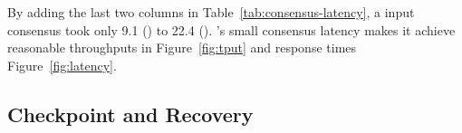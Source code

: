 By adding the last two columns in Table~\ref{tab:consensus-latency}, a 
\xxx input consensus took only 9.1 \us (\redis) to 22.4 \us (\mediatomb). 
\xxx's small consensus latency makes it achieve reasonable throughputs 
in Figure~\ref{fig:tput} and response times Figure~\ref{fig:latency}.














\subsection{Checkpoint and Recovery} \label{sec:robust}


